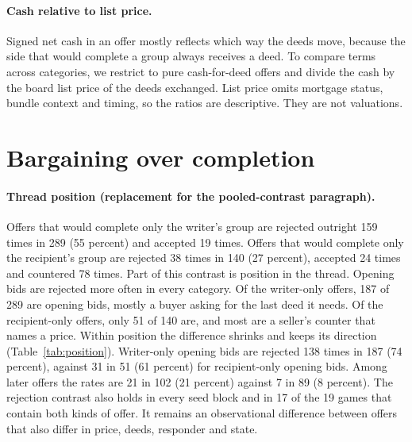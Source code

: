 \paragraph{Cash relative to list price.} Signed net cash in an offer mostly reflects which way the deeds move, because the side that would complete a group always receives a deed. To compare terms across categories, we restrict to pure cash-for-deed offers and divide the cash by the board list price of the deeds exchanged. List price omits mortgage status, bundle context and timing, so the ratios are descriptive. They are not valuations.

\section{Bargaining over completion}\label{sec:bargaining}

\paragraph{Thread position (replacement for the pooled-contrast paragraph).} Offers that would complete only the writer's group are rejected outright 159 times in 289 (55 percent) and accepted 19 times. Offers that would complete only the recipient's group are rejected 38 times in 140 (27 percent), accepted 24 times and countered 78 times. Part of this contrast is position in the thread. Opening bids are rejected more often in every category. Of the writer-only offers, 187 of 289 are opening bids, mostly a buyer asking for the last deed it needs. Of the recipient-only offers, only 51 of 140 are, and most are a seller's counter that names a price. Within position the difference shrinks and keeps its direction (Table~\ref{tab:position}). Writer-only opening bids are rejected 138 times in 187 (74 percent), against 31 in 51 (61 percent) for recipient-only opening bids. Among later offers the rates are 21 in 102 (21 percent) against 7 in 89 (8 percent). The rejection contrast also holds in every seed block and in 17 of the 19 games that contain both kinds of offer. It remains an observational difference between offers that also differ in price, deeds, responder and state.

